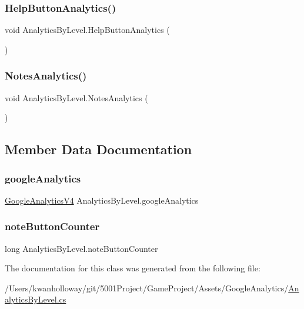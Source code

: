 \subsubsection{\texorpdfstring{Help\+Button\+Analytics()}{HelpButtonAnalytics()}}
{\footnotesize\ttfamily void Analytics\+By\+Level.\+Help\+Button\+Analytics (\begin{DoxyParamCaption}{ }\end{DoxyParamCaption})}

\mbox{\label{class_analytics_by_level_aab0b06714a8b4e12b54519f312300ea9}} 
\subsubsection{\texorpdfstring{Notes\+Analytics()}{NotesAnalytics()}}
{\footnotesize\ttfamily void Analytics\+By\+Level.\+Notes\+Analytics (\begin{DoxyParamCaption}{ }\end{DoxyParamCaption})}



\subsection{Member Data Documentation}
\mbox{\label{class_analytics_by_level_af182484a1794a3a7500cc5534e018e56}} 
\subsubsection{\texorpdfstring{google\+Analytics}{googleAnalytics}}
{\footnotesize\ttfamily \hyperlink{class_google_analytics_v4}{Google\+Analytics\+V4} Analytics\+By\+Level.\+google\+Analytics}

\mbox{\label{class_analytics_by_level_a06019735d6a4d667f90fb3d88615e6af}} 
\subsubsection{\texorpdfstring{note\+Button\+Counter}{noteButtonCounter}}
{\footnotesize\ttfamily long Analytics\+By\+Level.\+note\+Button\+Counter}



The documentation for this class was generated from the following file\+:\begin{DoxyCompactItemize}
\item 
/\+Users/kwanholloway/git/5001\+Project/\+Game\+Project/\+Assets/\+Google\+Analytics/\hyperlink{_analytics_by_level_8cs}{Analytics\+By\+Level.\+cs}\end{DoxyCompactItemize}
